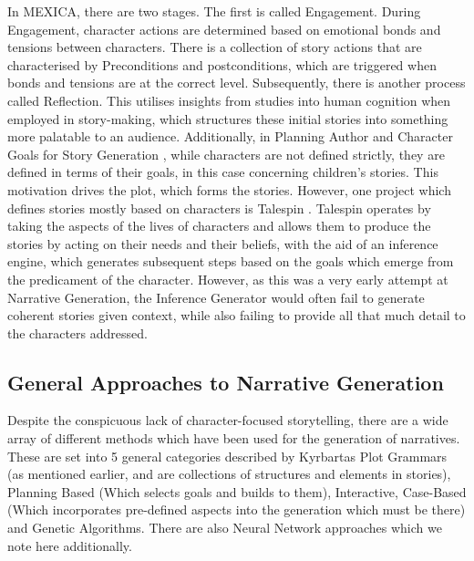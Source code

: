 \documentclass[11pt]{article}
\begin{document}
In MEXICA, there are two stages. The first is called Engagement. During Engagement, character actions are determined based on emotional bonds and tensions between characters. There is a collection of story actions that are characterised by Preconditions and postconditions, which are triggered when bonds and tensions are at the correct level. Subsequently, there is another process called Reflection. This utilises insights from studies into human cognition when employed in story-making, which structures these initial stories into something more palatable to an audience. Additionally, in Planning Author and Character Goals for Story Generation \cite{authorandcharactergoals}, while characters are not defined strictly, they are defined in terms of their goals, in this case concerning children's stories. This motivation drives the plot, which forms the stories. However, one project which defines stories mostly based on characters is Talespin \cite{Meehan1977TALESPINAI}. Talespin operates by taking the aspects of the lives of characters and allows them to produce the stories by acting on their needs and their beliefs, with the aid of an inference engine, which generates subsequent steps based on the goals which emerge from the predicament of the character. However, as this was a very early attempt at Narrative Generation, the Inference Generator would often fail to generate coherent stories given context, while also failing to provide all that much detail to the characters addressed.\\  
\subsection{General Approaches to Narrative Generation}
Despite the conspicuous lack of character-focused storytelling, there are a wide array of different methods which have been used for the generation of narratives. These are set into 5 general categories described by Kyrbartas\cite{KybartasGenerationTechniques} \: Plot Grammars (as mentioned earlier, and are collections of structures and elements in stories), Planning Based (Which selects goals and builds to them), Interactive, Case-Based (Which incorporates pre-defined aspects into the generation which must be there) and Genetic Algorithms. There are also Neural Network approaches which we note here additionally.\\
\end{document}
